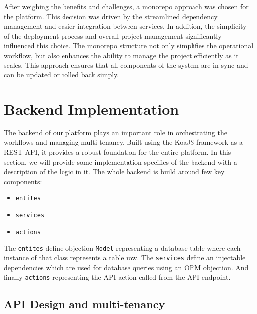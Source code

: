 After weighing the benefits and challenges, a \ac{monorepo} approach was chosen for the platform. 
This decision was driven by the streamlined dependency management and easier integration between services.
In addition, the simplicity of the deployment process and overall project management significantly influenced this choice. 
The \ac{monorepo} structure not only simplifies the operational workflow, but also enhances the ability to manage the project efficiently as it scales. 
This approach ensures that all components of the system are in-sync and can be updated or rolled back simply.


\section{Backend Implementation}
\label{sec:backend-implementation}
The backend of our platform plays an important role in orchestrating the workflows and managing multi-tenancy.
Built using the KoaJS framework as a REST API, it provides a robust foundation for the entire platform.
In this section, we will provide some implementation specifics of the backend with a description of the logic in it.
The whole backend is build around few key components:
\begin{itemize}
    \item \texttt{entites}
    \item \texttt{services}
    \item \texttt{actions}
\end{itemize}

The \texttt{entites} define \gls{objection} \texttt{Model} representing a database table where each instance of that class represents a table row.
The \texttt{services} define an injectable dependencies which are used for database queries using an \ac{ORM} \gls{objection}.
And finally \texttt{actions} representing the API action called from the API endpoint.

\subsection{API Design and multi-tenancy}
\label{subsec:api-design-endpoints}

